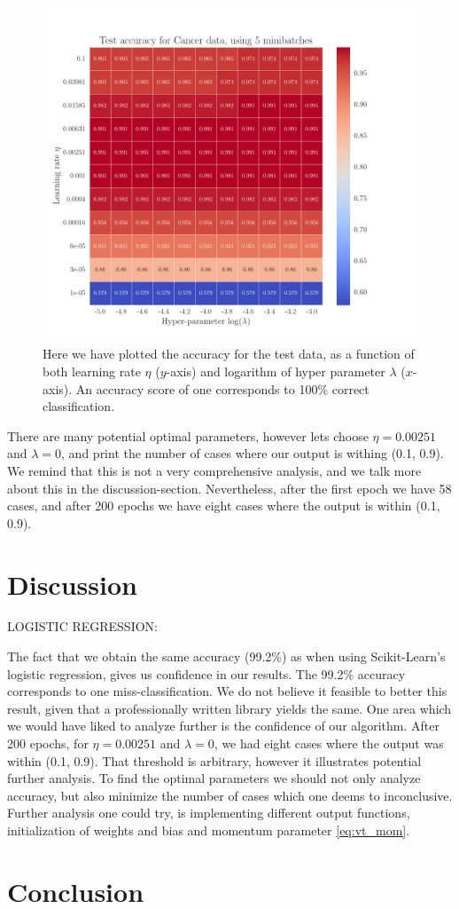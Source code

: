 \documentclass[12pt]{extarticle}
\begin{document}
\begin{figure}[h]
	\includegraphics[width=\linewidth]{../output/plots/reg_Cancer__lambda_eta__Test_accuracy__860729.pdf}
	\caption{Here we have plotted the accuracy for the test data, as a function of both learning rate $\eta$ ($y$-axis) and logarithm of hyper parameter $\lambda$ ($x$-axis). An accuracy score of one corresponds to 100\% correct classification.}\label{fig:logreg_eta_lambda}
\end{figure}

There are many potential optimal parameters, however lets choose $\eta= 0.00251$ and $\lambda = 0$, and print the number of cases where our output is withing (0.1, 0.9). We remind that this is not a very comprehensive analysis, and we talk more about this in the discussion-section. Nevertheless, after the first epoch we have 58 cases, and after 200 epochs we have eight cases where the output is within (0.1, 0.9).

\clearpage

\section{Discussion}

LOGISTIC REGRESSION:

The fact that we obtain the same accuracy (99.2\%) as when using Scikit-Learn's logistic regression, gives us confidence in our results. The 99.2\% accuracy corresponds to one miss-classification. We do not believe it feasible to better this result, given that a professionally written library yields the same. One area which we would have liked to analyze further is the confidence of our algorithm. After 200 epochs, for $\eta = 0.00251$ and $\lambda = 0$, we had eight cases where the output was within (0.1, 0.9). That threshold is arbitrary, however it illustrates potential further analysis. To find the optimal parameters we should not only analyze accuracy, but also minimize the number of cases which one deems to inconclusive. Further analysis one could try, is implementing different output functions, initialization of weights and bias and momentum parameter \eqref{eq:vt_mom}.


\section{Conclusion}




\end{document}
